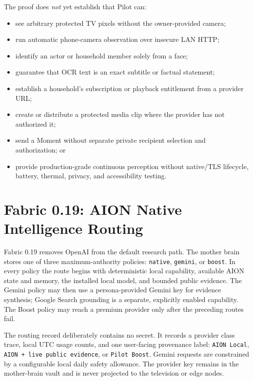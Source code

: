 \documentclass[11pt,a4paper]{article}
\begin{document}
The proof does \emph{not} yet establish that Pilot can:

\begin{itemize}[leftmargin=*]
  \item see arbitrary protected TV pixels without the owner-provided camera;
  \item run automatic phone-camera observation over insecure LAN HTTP;
  \item identify an actor or household member solely from a face;
  \item guarantee that OCR text is an exact subtitle or factual statement;
  \item establish a household's subscription or playback entitlement from a
        provider URL;
  \item create or distribute a protected media clip where the provider has not
        authorized it;
  \item send a Moment without separate private recipient selection and
        authorization; or
  \item provide production-grade continuous perception without native/TLS
        lifecycle, battery, thermal, privacy, and accessibility testing.
\end{itemize}

\section{Fabric 0.19: AION Native Intelligence Routing}

Fabric 0.19 removes OpenAI from the default research path.  The mother brain
stores one of three maximum-authority policies: \texttt{native},
\texttt{gemini}, or \texttt{boost}.  In every policy the route begins with
deterministic local capability, available AION state and memory, the installed
local model, and bounded public evidence.  The Gemini policy may then use a
persona-provided Gemini key for evidence synthesis; Google Search grounding is
a separate, explicitly enabled capability.  The Boost policy may reach a
premium provider only after the preceding routes fail.

The routing record deliberately contains no secret.  It records a provider
class trace, local UTC usage counts, and one user-facing provenance label:
\texttt{AION Local}, \texttt{AION + live public evidence}, or
\texttt{Pilot Boost}.  Gemini requests are constrained by a configurable local
daily safety allowance.  The provider key remains in the mother-brain vault and
is never projected to the television or edge nodes.
\end{document}
